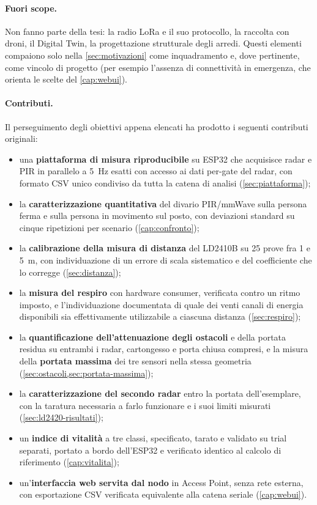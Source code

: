 \paragraph{Fuori scope.} Non fanno parte della tesi: la radio LoRa e il suo
protocollo, la raccolta con droni, il Digital Twin, la progettazione strutturale
degli arredi. Questi elementi compaiono solo nella \cref{sec:motivazioni} come
inquadramento e, dove pertinente, come vincolo di progetto (per esempio l'assenza
di connettività in emergenza, che orienta le scelte del \cref{cap:webui}).

\paragraph{Contributi.}
\label{sec:contributi}
Il perseguimento degli obiettivi appena elencati ha prodotto i seguenti contributi
originali:

\begin{itemize}[leftmargin=1.4em,itemsep=3pt]
  \item una \textbf{piattaforma di misura riproducibile} su ESP32 che acquisisce
        radar e PIR in parallelo a 5~Hz esatti con accesso ai dati per-gate del
        radar, con formato CSV unico condiviso da tutta la catena di analisi
        (\cref{sec:piattaforma});
  \item la \textbf{caratterizzazione quantitativa} del divario PIR/mmWave sulla
        persona ferma e sulla persona in movimento sul posto, con deviazioni
        standard su cinque ripetizioni per scenario (\cref{cap:confronto});
  \item la \textbf{calibrazione della misura di distanza} del LD2410B su 25 prove
        fra 1 e 5~m, con individuazione di un errore di scala sistematico e del
        coefficiente che lo corregge (\cref{sec:distanza});
  \item la \textbf{misura del respiro} con hardware consumer, verificata contro un
        ritmo imposto, e l'individuazione documentata di quale dei venti canali di
        energia disponibili sia effettivamente utilizzabile a ciascuna distanza
        (\cref{sec:respiro});
  \item la \textbf{quantificazione dell'attenuazione degli ostacoli} e della
        portata residua su entrambi i radar, cartongesso e porta chiusa compresi, e la
        misura della \textbf{portata massima} dei tre sensori nella stessa geometria
        (\cref{sec:ostacoli,sec:portata-massima});
  \item la \textbf{caratterizzazione del secondo radar} entro la portata
        dell'esemplare, con la taratura necessaria a farlo funzionare e i suoi limiti
        misurati (\cref{sec:ld2420-risultati});
  \item un \textbf{indice di vitalità} a tre classi, specificato, tarato e validato su
        trial separati, portato a bordo dell'ESP32 e verificato identico al calcolo di
        riferimento (\cref{cap:vitalita});
  \item un'\textbf{interfaccia web servita dal nodo} in Access Point, senza rete
        esterna, con esportazione CSV verificata equivalente alla catena seriale
        (\cref{cap:webui}).
\end{itemize}

